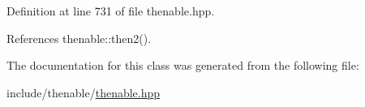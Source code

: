 Definition at line 731 of file thenable.\+hpp.



References thenable\+::then2().



The documentation for this class was generated from the following file\+:\begin{DoxyCompactItemize}
\item 
include/thenable/\hyperlink{thenable_8hpp}{thenable.\+hpp}\end{DoxyCompactItemize}
